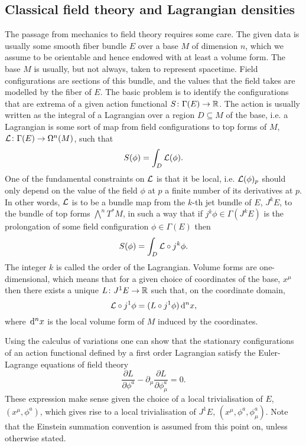\documentclass[../main.tex]{subfiles}
\begin{document}
\subsection{Classical field theory and Lagrangian densities}\label{sec:lagrangian
densities}
The passage from mechanics to field theory requires some care. The given data is usually some smooth fiber bundle \( E \) over a base \( M \) of dimension \(n\), which we assume to be orientable and hence endowed with at least a volume form. The base \(M\) is usually, but not always, taken to represent spacetime. Field configurations are sections of this bundle, and the values that the field takes are modelled by the fiber of \( E \). The basic problem is to identify the configurations that are extrema of a given action functional \( S \colon \Gamma(E) \to \mathbb{R} \). The action is usually written as the integral of a Lagrangian over a region \(D \subseteq M\) of the base, i.e. a Lagrangian is some sort of map from field configurations to top forms of $M$, \( \mathcal{L} \colon \Gamma(E) \to \Omega^{n}(M) \), such that
\begin{equation}
    S(\phi) = \int_D \mathcal{L}(\phi).
\end{equation}
One of the fundamental constraints on \( \mathcal{L} \) is that it be local, i.e. \( \mathcal{L}(\phi)_p \) should only depend on the value of the field \(\phi\) at \(p\) a finite number of its derivatives at \(p\). In other words, \( \mathcal{L} \) is to be a bundle map from the \( k \)-th jet bundle of \(E\), \(J^kE\), to the bundle of top forms \( \bigwedge^{n}T^\ast M\), in such a way that if \(j^k \phi \in \Gamma(J^kE) \) is the prolongation of some field configuration \(\phi \in \Gamma(E) \) then
\begin{equation}
    S(\phi) = \int_D \mathcal{L} \circ j^k\phi.
\end{equation}
The integer \(k\) is called the order of the Lagrangian. Volume forms are one-dimensional, which means that for a given choice of coordinates of the base, \( x^\mu\) then there exists a unique \(L\colon J^1E \to \mathbb{R}\) such that, on the coordinate domain,
\begin{equation}
     \mathcal{L} \circ j^1\phi = (L\circ j^1\phi) \,\mathrm{d}^n x,
\end{equation}
where \( \,\mathrm{d}^nx \) is the local volume form of \(M  \) induced by the coordinates.

Using the calculus of variations one can show that the stationary configurations of an action functional defined by a first order Lagrangian satisfy the Euler-Lagrange equations of field theory
\begin{equation*}
	\frac{\partial L}{\partial \phi^a} - \partial_\mu \frac{\partial L}{\partial
	\phi^a_\mu} = 0. 
\end{equation*}
These expression make sense given the choice of a local trivialisation of \(E\), \((x^\mu, \phi^a)\), which gives rise to a local trivialisation of \(J^1E\), \((x^\mu, \phi^a, \phi^a_\mu)\). Note that the Einstein summation convention is assumed from this point on, unless otherwise stated.
\end{document}
